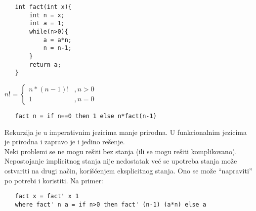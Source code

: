 \documentclass[../main.tex]{subfiles}
\begin{document}
	   \begin{multicols}{2}
	   \begin{boxprimer}
	   \begin{Verbatim}
   int fact(int x){
	   int n = x;
	   int a = 1;
	   while(n>0){
		   a = a*n;
		   n = n-1;
	   }
	   return a;
   }
	   \end{Verbatim}
	   \end{boxprimer}
	   
	   \columnbreak
	   
	   \begin{boxprimer}
	   $n!=\left\{ \begin{array}{cc} n*(n-1)! &, n>0\\ 1 &, n=0 \end{array}\right.$
	   \end{boxprimer}
	   
	   \begin{boxprimer}
	   \begin{Verbatim}
   fact n = if n==0 then 1 else n*fact(n-1)
	   \end{Verbatim}
	   \end{boxprimer}
	   \end{multicols}
	   
	   Rekurzija je u imperativnim jezicima manje prirodna. U funkcionalnim jezicima je prirodna i zapravo je i jedino rešenje.
	   \\
	   Neki problemi se ne mogu rešiti bez stanja (ili se mogu rešiti komplikovano). Nepostojanje implicitnog stanja nije nedostatak već se upotreba stanja može ostvariti na drugi način, korišćenjem eksplicitnog stanja. Ono se može ``napraviti'' po potrebi i koristiti. Na primer:
	   \begin{boxprimer}
	   \begin{Verbatim}
   fact x = fact' x 1
   where fact' n a = if n>0 then fact' (n-1) (a*n) else a
	   \end{Verbatim}
	   \end{boxprimer}
	   
\end{document}

